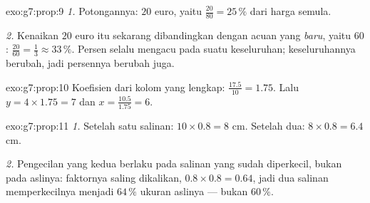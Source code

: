 \begin{solution}{exo:g7:prop:9}
\emph{1.} Potongannya: $20$ euro, yaitu $\frac{20}{80} = 25\,\%$ dari
harga semula.

\emph{2.} Kenaikan $20$ euro itu sekarang dibandingkan dengan acuan
yang \emph{baru}, yaitu $60$: $\frac{20}{60} = \frac13 \approx 33\,\%$.
Persen selalu mengacu pada suatu keseluruhan; keseluruhannya berubah,
jadi persennya berubah juga.
\end{solution}

\begin{solution}{exo:g7:prop:10}
Koefisien dari kolom yang lengkap: $\frac{17.5}{10} = 1.75$. Lalu
$y = 4 \times 1.75 = 7$ dan $x = \frac{10.5}{1.75} = 6$.
\end{solution}

\begin{solution}{exo:g7:prop:11}
\emph{1.} Setelah satu salinan: $10 \times 0.8 = 8$ cm. Setelah dua:
$8 \times 0.8 = 6.4$ cm.

\emph{2.} Pengecilan yang kedua berlaku pada salinan yang sudah
diperkecil, bukan pada aslinya: faktornya saling dikalikan,
$0.8 \times 0.8 = 0.64$, jadi dua salinan memperkecilnya menjadi
$64\,\%$ ukuran aslinya --- bukan $60\,\%$.
\end{solution}

